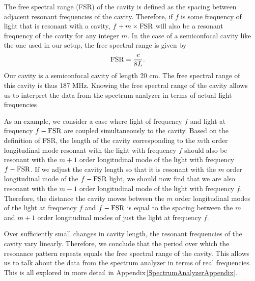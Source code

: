 The free spectral range (FSR) of the cavity is defined as the spacing between adjacent resonant frequencies of the cavity. Therefore, if $f$ is some frequency of light that is resonant with a cavity, $f+m\times \textnormal{FSR}$ will also be a resonant frequency of the cavity for any integer $m$. In the case of a semiconfocal cavity like the one used in our setup, the free spectral range is given by 
\begin{equation}
    \textnormal{FSR}=\frac{c}{8L}.
\end{equation}
Our cavity is a semiconfocal cavity of length $20$ cm. The free spectral range of this cavity is thus 187 MHz. 
Knowing the free spectral range of the cavity allows us to interpret the data from the spectrum analyzer in terms of actual light frequencies

As an example, we consider a case where light of frequency $f$ and light at frequency $f-\textnormal{FSR}$ are coupled simultaneously to the cavity. Based on the definition of FSR, the length of the cavity corresponding to the $m$th order longitudinal mode resonant with the light with frequency $f$ should also be resonant with the $m+1$ order longitudinal mode of the light with frequency $f-\textnormal{FSR}$.
If we adjust the cavity length so that it is resonant with the $m$ order longitudinal mode of the $f-\textnormal{FSR}$ light, we should now find that we are also resonant with the $m-1$ order longitudinal mode of the light with frequency $f$. Therefore, the distance the cavity moves between the $m$ order longitudinal modes of the light at frequency $f$ and $f-\textnormal{FSR}$ is equal to the spacing between the $m$ and $m+1$ order longitudinal modes of just the light at frequency $f$.

Over sufficiently small changes in cavity length, the resonant frequencies of the cavity vary linearly. Therefore, we conclude that the period over which the resonance pattern repeats equals the free spectral range of the cavity. This allows us to talk about the data from the spectrum analyzer in terms of real frequencies. 
This is all explored in more detail in Appendix\,\ref{SpectrumAnalyzerAppendix}.

